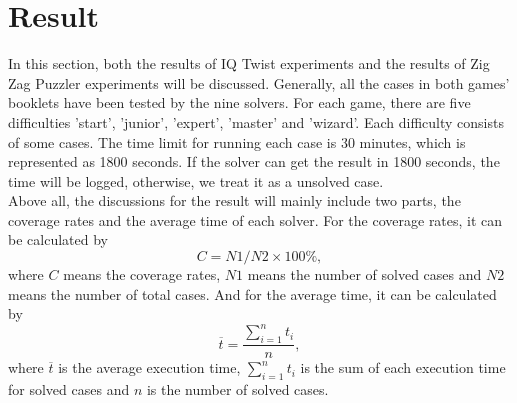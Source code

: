 \section{Result}
\label{sec:Result}
In this section, both the results of IQ Twist experiments and the results of Zig Zag Puzzler experiments will be discussed. Generally, all the cases in both games' booklets have been tested by the nine solvers. For each game, there are five difficulties 'start', 'junior', 'expert', 'master' and 'wizard'. Each difficulty consists of some cases. The time limit for running each case is 30 minutes, which is represented as 1800 seconds. If the solver can get the result in 1800 seconds, the time will be logged, otherwise, we treat it as a unsolved case. 
\\Above all, the discussions for the result will mainly include two parts, the coverage rates and the average time of each solver. For the coverage rates, it can be calculated by 
\begin{equation}
\label{equation:coverage}
   C= N1/N2\times 100\% ,
\end{equation}
where $C$ means the coverage rates, $N1$ means the number of solved cases and $N2$ means the number of total cases. And for the average time, it can be calculated by 
\begin{equation}
\label{equation:averagetime}
\overline{t}=\frac{\sum\limits_{i=1}^n t_{i}}{n},
\end{equation}
where $\overline{t}$ is the average execution time, $\sum\limits_{i=1}^n t_{i}$ is the sum of each execution time for solved cases and $n$ is the number of solved cases.
